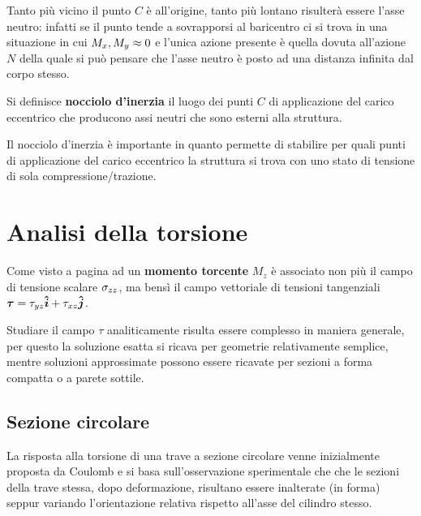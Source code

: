     	\begin{osservazione}
    		Tanto più vicino il punto $C$ è all'origine, tanto più lontano risulterà essere l'asse neutro: infatti se il punto tende a sovrapporsi al baricentro ci si trova in una situazione in cui $M_x,M_y \approx 0$ e l'unica azione presente è quella dovuta all'azione $N$ della quale si può pensare che l'asse neutro è posto ad una distanza infinita dal corpo stesso.
    	\end{osservazione}
    	
    	\begin{concetto}
    		Si definisce \textbf{nocciolo d'inerzia} il luogo dei punti $C$ di applicazione del carico eccentrico che producono assi neutri che sono esterni alla struttura.
    	\end{concetto}
    	Il nocciolo d'inerzia è importante in quanto permette di stabilire per quali punti di applicazione del carico eccentrico la struttura si trova con uno stato di tensione di sola compressione/trazione.
    	
\section{Analisi della torsione}
	Come visto a pagina \pageref{eq:sv:equivstatica} ad un \textbf{momento torcente} $M_z$ è associato non più il campo di tensione scalare $\sigma_{zz}$, ma bensì il campo vettoriale di tensioni tangenziali $\boldsymbol{\tau} = \tau_{yz} \boldsymbol{\hat{i}} + \tau_{xz} \boldsymbol{\hat{j}}$.
	
	Studiare il campo $\tau$ analiticamente risulta essere complesso in maniera generale, per questo la soluzione esatta si ricava per geometrie relativamente semplice, mentre soluzioni approssimate possono essere ricavate per sezioni a forma compatta o a parete sottile.
	
	\subsection{Sezione circolare}
		La risposta alla torsione di una trave a sezione circolare venne inizialmente proposta da Coulomb e si basa sull'osservazione sperimentale che che le sezioni della trave stessa, dopo deformazione, risultano essere inalterate (in forma) seppur variando l'orientazione relativa rispetto all'asse del cilindro stesso.
		
